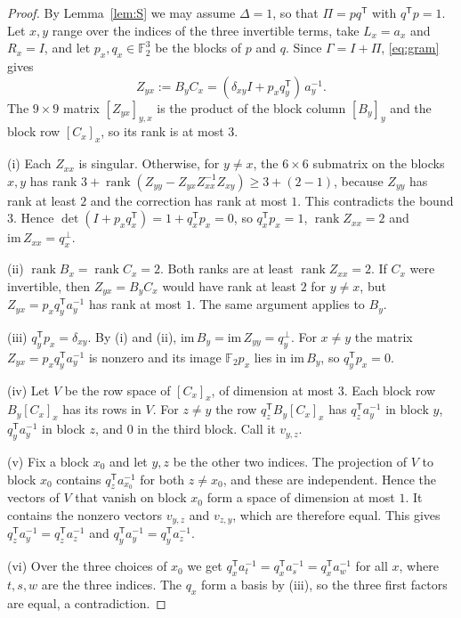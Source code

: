\documentclass[11pt]{amsart}
\theoremstyle{definition}
\theoremstyle{remark}
\numberwithin{equation}{section}
\newcommand{\F}{\mathbb{F}_2}
\newcommand{\rk}{\operatorname{rank}}
\begin{document}
\begin{proof}
By Lemma~\ref{lem:S} we may assume $\Delta=1$, so that $\Pi=pq^{\mathsf T}$ with $q^{\mathsf T}p=1$. Let $x,y$ range over the indices of the three invertible terms, take $L_x=a_x$ and $R_x=I$, and let $p_x,q_x\in\F^3$ be the blocks of $p$ and $q$. Since $\Gamma=I+\Pi$, \eqref{eq:gram} gives
\[
Z_{yx}:=B_yC_x=(\delta_{xy}I+p_xq_y^{\mathsf T})\,a_y^{-1}.
\]
The $9\times 9$ matrix $[Z_{yx}]_{y,x}$ is the product of the block column $[B_y]_y$ and the block row $[C_x]_x$, so its rank is at most $3$.

(i) Each $Z_{xx}$ is singular. Otherwise, for $y\ne x$, the $6\times 6$ submatrix on the blocks $x,y$ has rank $3+\rk(Z_{yy}-Z_{yx}Z_{xx}^{-1}Z_{xy})\ge 3+(2-1)$, because $Z_{yy}$ has rank at least $2$ and the correction has rank at most $1$. This contradicts the bound $3$. Hence $\det(I+p_xq_x^{\mathsf T})=1+q_x^{\mathsf T}p_x=0$, so $q_x^{\mathsf T}p_x=1$, $\rk Z_{xx}=2$ and $\mathrm{im}\,Z_{xx}=q_x^{\perp}$.

(ii) $\rk B_x=\rk C_x=2$. Both ranks are at least $\rk Z_{xx}=2$. If $C_x$ were invertible, then $Z_{yx}=B_yC_x$ would have rank at least $2$ for $y\ne x$, but $Z_{yx}=p_xq_y^{\mathsf T}a_y^{-1}$ has rank at most $1$. The same argument applies to $B_y$.

(iii) $q_y^{\mathsf T}p_x=\delta_{xy}$. By (i) and (ii), $\mathrm{im}\,B_y=\mathrm{im}\,Z_{yy}=q_y^{\perp}$. For $x\ne y$ the matrix $Z_{yx}=p_xq_y^{\mathsf T}a_y^{-1}$ is nonzero and its image $\F p_x$ lies in $\mathrm{im}\,B_y$, so $q_y^{\mathsf T}p_x=0$.

(iv) Let $V$ be the row space of $[C_x]_x$, of dimension at most $3$. Each block row $B_y[C_x]_x$ has its rows in $V$. For $z\ne y$ the row $q_z^{\mathsf T}B_y[C_x]_x$ has $q_z^{\mathsf T}a_y^{-1}$ in block $y$, $q_y^{\mathsf T}a_y^{-1}$ in block $z$, and $0$ in the third block. Call it $v_{y,z}$.

(v) Fix a block $x_0$ and let $y,z$ be the other two indices. The projection of $V$ to block $x_0$ contains $q_z^{\mathsf T}a_{x_0}^{-1}$ for both $z\ne x_0$, and these are independent. Hence the vectors of $V$ that vanish on block $x_0$ form a space of dimension at most $1$. It contains the nonzero vectors $v_{y,z}$ and $v_{z,y}$, which are therefore equal. This gives $q_z^{\mathsf T}a_y^{-1}=q_z^{\mathsf T}a_z^{-1}$ and $q_y^{\mathsf T}a_y^{-1}=q_y^{\mathsf T}a_z^{-1}$.

(vi) Over the three choices of $x_0$ we get $q_x^{\mathsf T}a_t^{-1}=q_x^{\mathsf T}a_s^{-1}=q_x^{\mathsf T}a_w^{-1}$ for all $x$, where $t,s,w$ are the three indices. The $q_x$ form a basis by (iii), so the three first factors are equal, a contradiction.
\end{proof}
\end{document}
